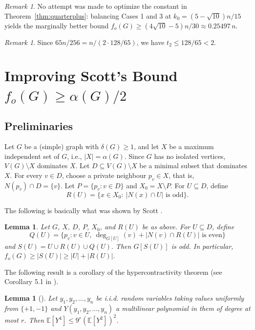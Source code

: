 \documentclass[11pt]{article}
\newcommand{\VV}[1]{{#1}}
\newtheorem{lemma}[theorem]{Lemma}
\theoremstyle{definition}
\theoremstyle{remark}
\newtheorem{remark}[theorem]{Remark}
\newcommand{\fo}{f_o}
\newcommand{\1}{\mathbf{1}}
\begin{document}
	\begin{remark}
	No attempt was made to optimize the constant in Theorem~\ref{thm:quarterplus}: balancing Cases 1 and 3 at $k_0=(5-\sqrt{10})n/15$ yields the marginally better bound $\fo(G)\ge (4\sqrt{10}-5)n/30\approx 0.25497\,n$.
	\end{remark}
	

	\begin{remark} Since $65n/256=n/(2\cdot 128/65)$, we have $t_2\le 128/65<2$.
	\end{remark}
	
	\section{Improving Scott's Bound $\fo(G)\ge \alpha(G)/2$}\label{sec:alpha}
	
	\subsection{Preliminaries}
	
	Let $G$ be a (simple) graph with $\delta(G)\ge 1$, and let $X$ be a maximum independent set of $G$, i.e., $|X|=\alpha(G).$
	Since $G$ has no isolated vertices, $V(G)\setminus X$ dominates $X$.  Let $D\subseteq V(G)\setminus X$ be a minimal subset that dominates $X$.  For every $v\in D$, choose a private neighbour $p_v\in X$, that is, $N(p_v)\cap D=\{v\}.$ Let $P=\{p_v:v\in D\}$ and $X_0=X\setminus P.$
	For $U\subseteq D$, define $$R(U)=\{x\in X_0:\ |N(x)\cap U|\text{ is odd}\}.$$
	
	The following is basically what was shown by Scott \cite{Scott1992}. 
	
	\begin{lemma}\label{lem:simple-lemma2}
		Let $G$, $X$, $D$, $P$, $X_0$, and $R(U)$ be as above.  For $U\subseteq D$, define
		$$
		Q(U)=\{p_v:v\in U,\ \deg_{G[U]}(v)+|N(v)\cap R(U)|\text{ is even}\}
		$$
		and
		$
		S(U)=U\cup R(U)\cup Q(U).
		$
		Then $G[S(U)]$ is odd.  In particular,
		$\fo(G)\ge |S(U)|\ge |U|+|R(U)|.$
	\end{lemma}
	
	The following result is a corollary of the hypercontractivity theorem (see Corollary 5.1 in \cite{ODonnell2008}). 
	
	\begin{lemma}[\cite{ODonnell2008}]\label{lem:hct}
		Let $y_1,y_2,\dots,y_n$ be i.i.d. random variables taking values uniformly from $\{+1,-1\}$ and $Y(y_1,y_2,\dots,y_n)$ a multilinear polynomial \VV{in them of} degree at most $r$. Then $\mathbb{E}[Y^4]\leq 9^{r} (\mathbb{E}[Y^2])^2$.
	\end{lemma}
	
\end{document}
